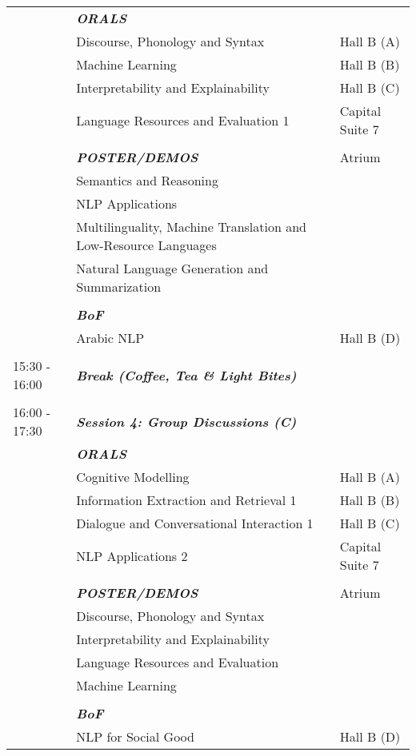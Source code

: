 \begin{longtable}{p{15mm}p{60mm}p{30mm}}
& \emph{\textbf{ORALS}} & \\
&  Discourse, Phonology and Syntax & Hall B (A) \\
&  Machine Learning & Hall B (B) \\
&  Interpretability and Explainability & Hall B (C) \\
&  Language Resources and Evaluation 1 & Capital Suite 7 \\\\
& \emph{\textbf{POSTER/DEMOS}} & Atrium \\
& Semantics and Reasoning & \\
& NLP Applications & \\
& Multilinguality, Machine Translation and Low-Resource Languages & \\
& Natural Language Generation and Summarization & \\\\
& \emph{{\textbf{BoF}}} & \\
& Arabic NLP & Hall B (D) \\\\
{15:30 - 16:00} & \emph{\textbf{Break (Coffee, Tea \& Light Bites)}} & \\\\
{16:00 - 17:30} & \emph{\textbf{Session 4: Group Discussions (C)}} & \\
& \emph{\textbf{ORALS}} & \\
& Cognitive Modelling & Hall B (A) \\
& Information Extraction and Retrieval 1 & Hall B (B) \\
& Dialogue and Conversational Interaction 1 & Hall B (C) \\
& NLP Applications 2 & Capital Suite 7 \\\\
& \emph{\textbf{POSTER/DEMOS}} & Atrium\\
& Discourse, Phonology and Syntax & \\
& Interpretability and Explainability & \\
& Language Resources and Evaluation & \\
& Machine Learning & \\\\
& \emph{\textbf{BoF}} & \\
& NLP for Social Good & Hall B (D) \\
\end{longtable}

